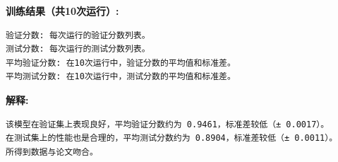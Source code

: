 \documentclass{article}
\begin{document}
\textbf{训练结果（共10次运行）:}

\begin{verbatim}
验证分数: 每次运行的验证分数列表。
测试分数: 每次运行的测试分数列表。
平均验证分数: 在10次运行中，验证分数的平均值和标准差。
平均测试分数: 在10次运行中，测试分数的平均值和标准差。
\end{verbatim}

\textbf{解释:}

\begin{verbatim}
该模型在验证集上表现良好，平均验证分数约为 0.9461，标准差较低（± 0.0017）。
在测试集上的性能也是合理的，平均测试分数约为 0.8904，标准差较低（± 0.0011）。
所得到数据与论文吻合。
\end{verbatim}
\end{document}
